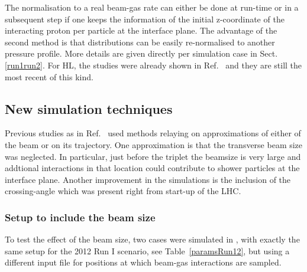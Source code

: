 The normalisation to a real beam-gas rate can either be done at run-time or in a subsequent step if one keeps the information of the initial z-coordinate of the interacting proton per particle at the interface plane. The advantage of the second method is that distributions can be easily re-normalised to another pressure profile. More details are given directly per simulation case in Sect.\ref{run1run2}. For HL, the studies were already shown in Ref.~\cite{ipac2014_rkh} and they are still the most recent of this kind.%

\subsection{New simulation techniques}
Previous studies as in Ref.~\cite{nimPaperRod} used methods relaying on approximations of either of the beam or on its trajectory. One approximation is that the transverse beam size was neglected. In particular, just before the triplet the beamsize is very large and addtional interactions in that location could contribute to shower particles at the interface plane. Another improvement in the simulations is the inclusion of the crossing-angle which was present right from start-up of the LHC.

\subsubsection{Setup to include the beam size}
To test the effect of the beam size, two cases were simulated in \fluka, with exactly the same setup for the 2012 Run I scenario, see Table~\ref{paramsRun12}, but using a different input file for positions at which beam-gas interactions are sampled.

